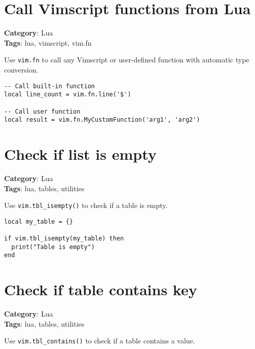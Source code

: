 {{{{{{\section{Call Vimscript functions from Lua}

\textbf{Category}: Lua\\ \textbf{Tags}: lua, vimscript, vim.fn
\vspace{0.5cm}

Use {\footnotesize \Verb§vim.fn§} to call any Vimscript or user-defined function with automatic type conversion.

\begin{Exa*}{}
\begin{Verbatim}[fontsize=\footnotesize, breaklines, breakanywhere]
-- Call built-in function
local line_count = vim.fn.line('$')

-- Call user function
local result = vim.fn.MyCustomFunction('arg1', 'arg2')
\end{Verbatim}
\end{Exa*}

\section{Check if list is empty}

\textbf{Category}: Lua\\ \textbf{Tags}: lua, tables, utilities
\vspace{0.5cm}

Use {\footnotesize \Verb§vim.tbl_isempty()§} to check if a table is empty.

\begin{Exa*}{}
\begin{Verbatim}[fontsize=\footnotesize, breaklines, breakanywhere]
local my_table = {}

if vim.tbl_isempty(my_table) then
  print("Table is empty")
end
\end{Verbatim}
\end{Exa*}

\section{Check if table contains key}

\textbf{Category}: Lua\\ \textbf{Tags}: lua, tables, utilities
\vspace{0.5cm}

Use {\footnotesize \Verb§vim.tbl_contains()§} to check if a table contains a value.

}}}}}}
